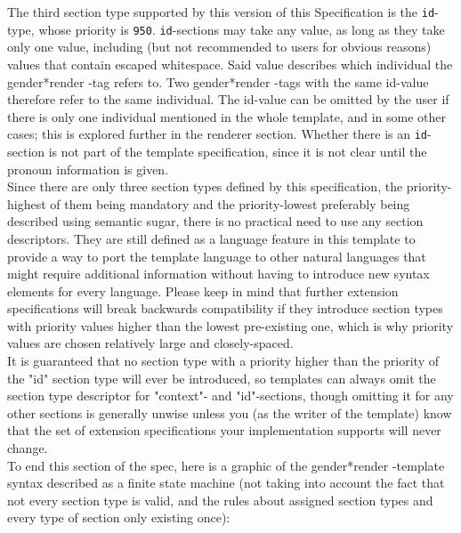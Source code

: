 \documentclass{article}
\newcommand{\GenderRender}{
    gender*render
}
\begin{document}
    The third section type supported by this version of this Specification is the \texttt{id}-type, whose priority is \texttt{950}.
    \texttt{id}-sections may take any value, as long as they take only one value, including (but not recommended to users for obvious reasons) values that contain escaped whitespace.
    Said value describes which individual the \GenderRender-tag refers to.
    Two \GenderRender-tags with the same id-value therefore refer to the same individual.
    The id-value can be omitted by the user if there is only one individual mentioned in the whole template, and in some other cases;
    this is explored further in the renderer section.
    Whether there is an \texttt{id}-section is not part of the template specification, since it is not clear until the pronoun information is given.\\

    Since there are only three section types defined by this specification, the priority-highest of them being mandatory and the priority-lowest preferably being described using semantic sugar, there is no practical need to use any section descriptors.
    They are still defined as a language feature in this template to provide a way to port the template language to other natural languages that might require additional information without having to introduce new syntax elements for every language.
    Please keep in mind that further extension specifications will break backwards compatibility if they introduce section types with priority values higher than the lowest pre-existing one, which is why priority values are chosen relatively large and closely-spaced.\\
    It is guaranteed that no section type with a priority higher than the priority of the "id" section type will ever be introduced, so templates can always omit the section type descriptor for "context"- and "id"-sections, though omitting it for any other sections is generally unwise unless you (as the writer of the template) know that the set of extension specifications your implementation supports will never change.\\

    To end this section of the spec, here is a graphic of the \GenderRender-template syntax described as a finite state machine (not taking into account the fact that not every section type is valid, and the rules about assigned section types and every type of section only existing once):\\
\end{document}
